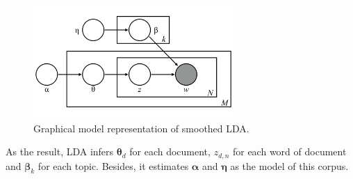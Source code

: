 \begin{figure}[!t]
\centering
\includegraphics[width=3in]{fig/LDA_model2.png}
\caption{Graphical model representation of smoothed LDA.}
\label{fig:LDA_model2}
\end{figure}

As the result, LDA infers $\boldsymbol{\theta}_d$ for each document, $z_{d,n}$ for each word of document and $\boldsymbol{\beta}_k$ for each topic. Besides, it estimates $\boldsymbol{\alpha}$ and $\boldsymbol{\eta}$ as the model of this corpus.